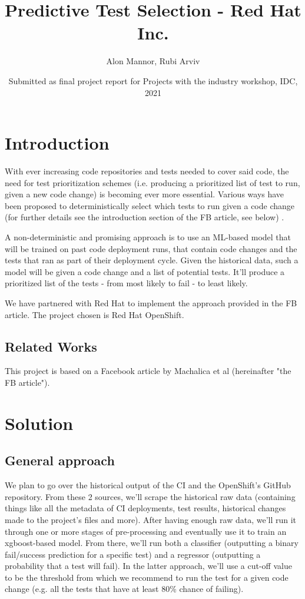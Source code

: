\documentclass{article}
\title{Predictive Test Selection - Red Hat Inc.}
\author{Alon Mannor, Rubi Arviv}
\date{Submitted as final project report for Projects with the industry workshop, IDC, 2021}
\begin{document}
\maketitle

\section{Introduction}

With ever increasing code repositories and tests needed to cover said code, the need for test prioritization schemes (i.e. producing a prioritized list of test to run, given a new code change) is becoming ever more essential. Various ways have been proposed to deterministically select which tests to run given a code change (for further details see the introduction section of the FB article, see below) .

A non-deterministic and promising approach is to use an ML-based model that will be trained on past code deployment runs, that contain code changes and the tests that ran as part of their deployment cycle. Given the historical data, such a model will be given a code change and a list of potential tests. It'll produce a prioritized list of the tests - from most likely to fail - to least likely. 

We have partnered with Red Hat to implement the approach provided in the FB article. The project chosen is Red Hat OpenShift.

\subsection{Related Works}
This project is based on a Facebook article by Machalica et al (hereinafter "the FB article").
\cite{MachalicaSP019}


\section{Solution}
\subsection{General approach}
We plan to go over the historical output of the CI and the OpenShift's GitHub repository. From these 2 sources, we'll scrape the historical raw data (containing things like all the metadata of CI deployments, test results, historical changes made to the project's files and more).
After having enough raw data, we'll run it through one or more stages of pre-processing and eventually use it to train an xgboost-based model. 
From there, we'll run both a classifier (outputting a binary fail/success prediction for a specific test) and a regressor (outputting a probability that a test will fail). In the latter approach, we'll use a cut-off value to be the threshold from which we recommend to run the test for a given code change (e.g. all the tests that have at least 80\% chance of failing).
\end{document}
